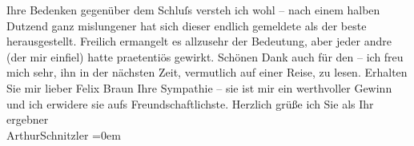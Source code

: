 \begin{ledgroupsized}[t]{13cm}
               Ihre Bedenken gegenüber dem Schluſs versteh ich wohl – nach einem halben Dutzend ganz
               mislungener hat sich dieser endlich gemeldete als der beste herausgestellt. Freilich
               ermangelt es allzusehr der Bedeutung, aber jeder andre (der mir einfiel) hatte
               praetentiös gewirkt.\pend
           \pstart
           Schönen Dank auch für den \label{K_L02487_1v}\label{K_L02487_1h} – ich freu mich sehr, ihn in der nächsten Zeit, vermutlich auf
               einer Reise, zu lesen. Erhalten Sie mir lieber Felix Braun Ihre Sympathie – {\pb}sie ist mir ein werthvoller Gewinn und ich
               erwidere sie aufs Freundschaftlichste.\pend
           \pstart
           Herzlich grüße ich Sie als Ihr ergebner{\\[\baselineskip]}\spacefill\mbox{ArthurSchnitzler}\pend
           \leftskip=0em{}
         
         \endnumbering{}\end{ledgroupsized}  \newcommand{\dateiname}{L02487}\newcommand{\titel}{Arthur Schnitzler an Felix Braun, 28. 5. 1927}\newcommand{\editorInnen}{Martin Anton Müller und Gerd-Hermann Susen}
      